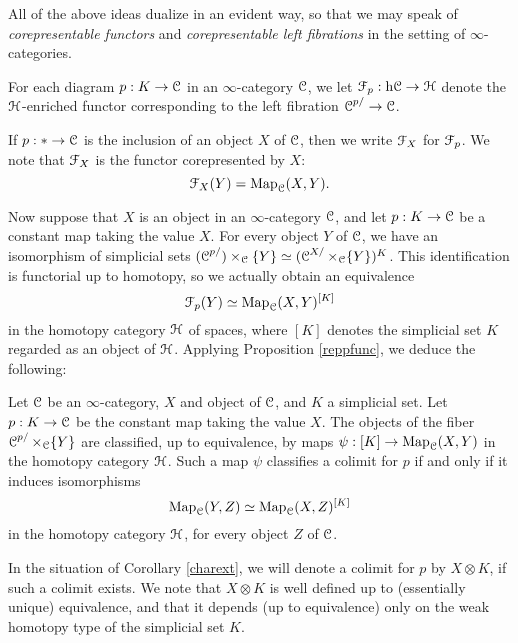 \begin{remark}
All of the above ideas dualize in an evident way, so that we may speak of {\it corepresentable functors} and {\it corepresentable left fibrations} in the setting of $\infty$-categories.
\end{remark}

\begin{notation}
For each diagram $p: K \rightarrow \operatorname{\mathcal{C}}$ in an $\infty$-category $\operatorname{\mathcal{C}}$, we let
$\operatorname{\mathcal{F}}_{p}: \rm{h} \it{\operatorname{\mathcal{C}}} \rightarrow \operatorname{\mathcal{H}}$ denote the $\operatorname{\mathcal{H}}$-enriched functor
corresponding to the left fibration $\operatorname{\mathcal{C}}^{p/} \rightarrow \operatorname{\mathcal{C}}$.

If $p: \ast \rightarrow \operatorname{\mathcal{C}}$ is the inclusion of an object $X$ of $\operatorname{\mathcal{C}}$, then we write $\operatorname{\mathcal{F}}_{X}$ for $\operatorname{\mathcal{F}}_{p}$. We note that $\operatorname{\mathcal{F}}_{X}$ is the functor corepresented by $X$:
$$ \operatorname{\mathcal{F}}_X(Y) = \operatorname{{Map}}_{\operatorname{\mathcal{C}}}(X,Y).$$
\end{notation}

Now suppose that $X$ is an object in an $\infty$-category $\operatorname{\mathcal{C}}$, and let $p: K \rightarrow \operatorname{\mathcal{C}}$
be a constant map taking the value $X$. For every object $Y$ of $\operatorname{\mathcal{C}}$, we have an isomorphism of simplicial sets
$(\operatorname{\mathcal{C}}^{p/}) \times_{\operatorname{\mathcal{C}}} \{Y\} \simeq ( \operatorname{\mathcal{C}}^{X/} \times_{\operatorname{\mathcal{C}}} \{Y\} )^K$. This identification is functorial up to homotopy, so we actually obtain an equivalence
$$\operatorname{\mathcal{F}}_{p}(Y) \simeq \operatorname{{Map}}_{\operatorname{\mathcal{C}}}(X,Y)^{[K]}$$
in the homotopy category $\operatorname{\mathcal{H}}$ of spaces, where $[K]$ denotes the simplicial set $K$ regarded as an object of $\operatorname{\mathcal{H}}$. Applying Proposition \ref{reppfunc}, we deduce the following:

\begin{corollary}\label{charext}
Let $\operatorname{\mathcal{C}}$ be an $\infty$-category, $X$ and object of $\operatorname{\mathcal{C}}$, and $K$ a simplicial set.
Let $p: K \rightarrow \operatorname{\mathcal{C}}$ be the constant map taking the value $X$. The objects of the fiber
$\operatorname{\mathcal{C}}^{p/} \times_{\operatorname{\mathcal{C}}} \{Y\}$ are classified, up to equivalence, by maps
$\psi: [K] \rightarrow \operatorname{{Map}}_{\operatorname{\mathcal{C}}}(X,Y)$
in the homotopy category $\operatorname{\mathcal{H}}$. Such a map $\psi$ classifies a colimit for $p$ if and only if
it induces isomorphisms
$$ \operatorname{{Map}}_{\operatorname{\mathcal{C}}}(Y,Z) \simeq \operatorname{{Map}}_{\operatorname{\mathcal{C}}}(X,Z)^{[K]} $$ 
in the homotopy category $\operatorname{\mathcal{H}}$, for every object $Z$ of $\operatorname{\mathcal{C}}$.
\end{corollary}

In the situation of Corollary \ref{charext}, we will denote a colimit for $p$ by $X \otimes K$, if such a colimit exists. We note that $X \otimes K$ is well defined up to (essentially unique) equivalence, and that it depends (up to equivalence) only on the weak homotopy type of the simplicial set $K$.

